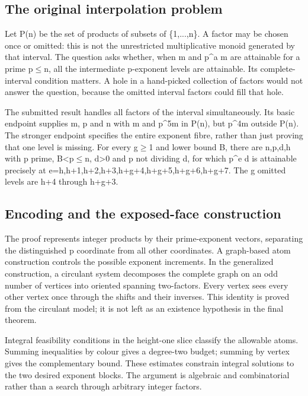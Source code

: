 \documentclass[11pt,a4paper]{article}
\begin{document}
\subsection{The original interpolation problem}
Let P(n) be the set of products of subsets of \{1,...,n\}. A factor may be chosen once or omitted: this is not the unrestricted multiplicative monoid generated by that interval. The question asks whether, when m and p\textasciicircum{}a m are attainable for a prime p\ensuremath{\leq}n, all the intermediate p-exponent levels are attainable. Its complete-interval condition matters. A hole in a hand-picked collection of factors would not answer the question, because the omitted interval factors could fill that hole.

The submitted result handles all factors of the interval simultaneously. Its basic endpoint supplies m, p and n with m and p\textasciicircum{}5m in P(n), but p\textasciicircum{}4m outside P(n). The stronger endpoint specifies the entire exponent fibre, rather than just proving that one level is missing. For every g\ensuremath{\geq}1 and lower bound B, there are n,p,d,h with p prime, B<p\ensuremath{\leq}n, d>0 and p not dividing d, for which p\textasciicircum{}e d is attainable precisely at e=h,h+1,h+2,h+3,h+g+4,h+g+5,h+g+6,h+g+7. The g omitted levels are h+4 through h+g+3.

\subsection{Encoding and the exposed-face construction}
The proof represents integer products by their prime-exponent vectors, separating the distinguished p coordinate from all other coordinates. A graph-based atom construction controls the possible exponent increments. In the generalized construction, a circulant system decomposes the complete graph on an odd number of vertices into oriented spanning two-factors. Every vertex sees every other vertex once through the shifts and their inverses. This identity is proved from the circulant model; it is not left as an existence hypothesis in the final theorem.

Integral feasibility conditions in the height-one slice classify the allowable atoms. Summing inequalities by colour gives a degree-two budget; summing by vertex gives the complementary bound. These estimates constrain integral solutions to the two desired exponent blocks. The argument is algebraic and combinatorial rather than a search through arbitrary integer factors.
\end{document}
